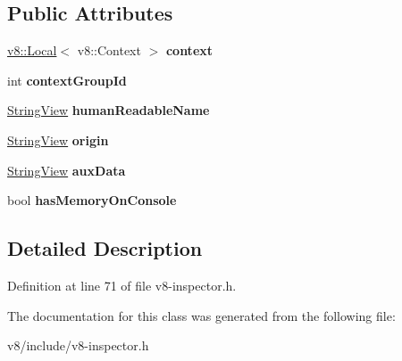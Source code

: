 \subsection*{Public Attributes}
\begin{DoxyCompactItemize}
\item 
\mbox{\label{classv8__inspector_1_1V8ContextInfo_a24c69a2cb86febdcd30605f9edea8b21}} 
\mbox{\hyperlink{classv8_1_1Local}{v8\+::\+Local}}$<$ v8\+::\+Context $>$ {\bfseries context}
\item 
\mbox{\label{classv8__inspector_1_1V8ContextInfo_a4958fb8bfe5ec4aa77ebdfe29b1e9a30}} 
int {\bfseries context\+Group\+Id}
\item 
\mbox{\label{classv8__inspector_1_1V8ContextInfo_a393412db9d07a12be7b4bf8f3465b8fd}} 
\mbox{\hyperlink{classv8__inspector_1_1StringView}{String\+View}} {\bfseries human\+Readable\+Name}
\item 
\mbox{\label{classv8__inspector_1_1V8ContextInfo_acd3feac7585871ae24b2cf910140b743}} 
\mbox{\hyperlink{classv8__inspector_1_1StringView}{String\+View}} {\bfseries origin}
\item 
\mbox{\label{classv8__inspector_1_1V8ContextInfo_afda75b31c49cd9f4e664ec7068979d9a}} 
\mbox{\hyperlink{classv8__inspector_1_1StringView}{String\+View}} {\bfseries aux\+Data}
\item 
\mbox{\label{classv8__inspector_1_1V8ContextInfo_a2c523d93043e7f4b018c470dad60b41f}} 
bool {\bfseries has\+Memory\+On\+Console}
\end{DoxyCompactItemize}


\subsection{Detailed Description}


Definition at line 71 of file v8-\/inspector.\+h.



The documentation for this class was generated from the following file\+:\begin{DoxyCompactItemize}
\item 
v8/include/v8-\/inspector.\+h\end{DoxyCompactItemize}
